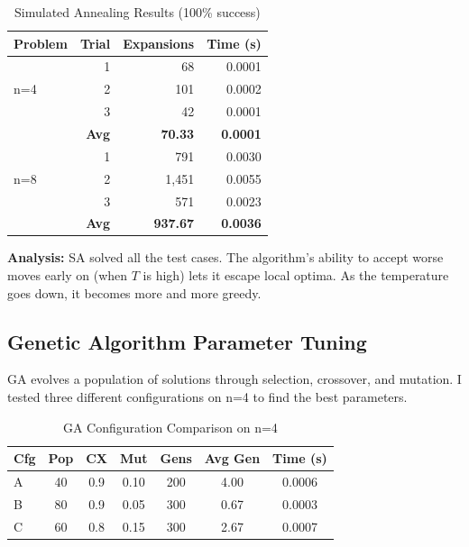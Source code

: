 \documentclass[letterpaper]{article}
\begin{document}
\begin{table}[h]
\centering
\tiny
\begin{tabular}{lrrr}
\toprule
\textbf{Problem} & \textbf{Trial} & \textbf{Expansions} & \textbf{Time (s)} \\
\midrule
\multirow{3}{*}{n=4} & 1 & 68 & 0.0001 \\
& 2 & 101 & 0.0002 \\
& 3 & 42 & 0.0001 \\
\cmidrule{2-4}
& \textbf{Avg} & \textbf{70.33} & \textbf{0.0001} \\
\midrule
\multirow{3}{*}{n=8} & 1 & 791 & 0.0030 \\
& 2 & 1,451 & 0.0055 \\
& 3 & 571 & 0.0023 \\
\cmidrule{2-4}
& \textbf{Avg} & \textbf{937.67} & \textbf{0.0036} \\
\bottomrule
\end{tabular}
\caption{Simulated Annealing Results (100\% success)}
\end{table}

\textbf{Analysis:} SA solved all the test cases. The algorithm's ability to accept worse moves early on (when $T$ is high) lets it escape local optima. As the temperature goes down, it becomes more and more greedy.

\subsection{Genetic Algorithm Parameter Tuning}

GA evolves a population of solutions through selection, crossover, and mutation. I tested three different configurations on n=4 to find the best parameters.

\begin{table}[h]
\centering
\tiny
\begin{tabular}{lcccccc}
\toprule
\textbf{Cfg} & \textbf{Pop} & \textbf{CX} & \textbf{Mut} & \textbf{Gens} & \textbf{Avg Gen} & \textbf{Time (s)} \\
\midrule
A & 40 & 0.9 & 0.10 & 200 & 4.00 & 0.0006 \\
B & 80 & 0.9 & 0.05 & 300 & 0.67 & 0.0003 \\
C & 60 & 0.8 & 0.15 & 300 & 2.67 & 0.0007 \\
\bottomrule
\end{tabular}
\caption{GA Configuration Comparison on n=4}
\end{table}
\end{document}
